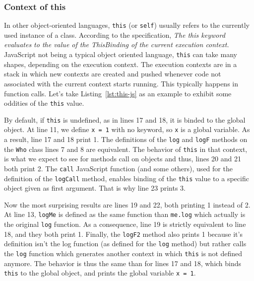 \subsubsection{Context of this}%
\label{ssub:context_of_this}

In other object-oriented languages,
\verb|this| (or \verb|self|) usually refers to the currently used instance of a class.
According to the specification,
\textit{The this keyword evaluates to the value of the ThisBinding of the current execution context.} 
JavaScript not being a typical object oriented language,
\verb|this| can take many shapes, depending on the execution context.
The execution contexts are in a stack in which new contexts are created and pushed
whenever code not associated with the current context starts running.
This typically happens in function calls.
Let's take Listing~\ref{lst:this-js} as an example
to exhibit some oddities of the \verb|this| value.


By default, if \verb|this| is undefined, as in lines 17 and 18,
it is binded to the global object.
At line 11, we define \verb|x = 1| with no keyword,
so \verb|x| is a global variable.
As a result, line 17 and 18 print 1.
The definitions of the \verb|log| and \verb|logF| methods on the \verb|Who| class
lines 7 and 8 are equivalent. The behavior of \verb|this| in that context,
is what we expect to see for methods call on objects and thus,
lines 20 and 21 both print 2.
The \verb|call| JavaScript function (and some others),
used for the definition of the \verb|logCall| method,
enables binding of the \verb|this| value to a specific object given as first argument.
That is why line 23 prints 3.

Now the most surprising results are lines 19 and 22, both printing 1 instead of 2.
At line 13, \verb|logMe| is defined as the same function than \verb|me.log| which
actually is the original \verb|log| function.
As a consequence, line 19 is strictly equivalent to line 18, and they both print 1.
Finally, the \verb|logF2| method also prints 1 because it's definition isn't the log function
(as defined for the \verb|log| method) but rather calls the \verb|log| function which
generates another context in which \verb|this| is not defined anymore.
The behavior is thus the same than for lines 17 and 18, which binds \verb|this| to the global object,
and prints the global variable \verb|x = 1|.


